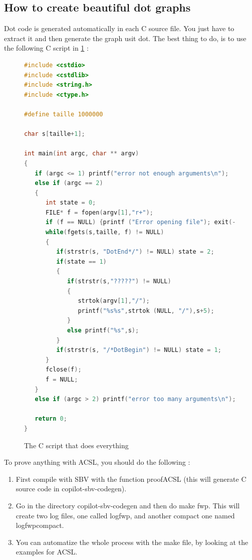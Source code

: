 \subsection{How to create beautiful dot graphs}
Dot code is generated automatically in each C source file. You just have to extract it and then generate the graph usit dot.
The best thing to do, is to use the following C script in \ref{fig:scriptdot} :
\begin{figure}[!htb]
\begin{lstlisting}[language=C]
#include <cstdio>
#include <cstdlib>
#include <string.h>
#include <ctype.h>

#define taille 1000000

char s[taille+1];

int main(int argc, char ** argv)
{
   if (argc <= 1) printf("error not enough arguments\n");
   else if (argc == 2) 
   {
      int state = 0;
      FILE* f = fopen(argv[1],"r+");
      if (f == NULL) {printf ("Error opening file"); exit(-1);}
      while(fgets(s,taille, f) != NULL)
      {
         if(strstr(s, "DotEnd*/") != NULL) state = 2;
         if(state == 1) 
         {
            if(strstr(s,"?????") != NULL)
            {   
               strtok(argv[1],"/");
               printf("%s%s",strtok (NULL, "/"),s+5);
            }
            else printf("%s",s);
         }
         if(strstr(s, "/*DotBegin") != NULL) state = 1;
      }
      fclose(f);
      f = NULL;
   }
   else if (argc > 2) printf("error too many arguments\n"); 

   return 0;
}

\end{lstlisting}
\caption{The C script that does everything}
\label{fig:scriptdot}
\end{figure}


To prove anything with ACSL, you should do the following :
\begin{enumerate}
	\item First compile with SBV with the function proofACSL (this will generate C source code in copilot-sbv-codegen).
	\item Go in the directory copilot-sbv-codegen and then do make fwp. This will create two log files, one called logfwp, and another compact one named logfwpcompact.
	\item You can automatize the whole process with the make file, by looking at the examples for ACSL.
\end{enumerate}

